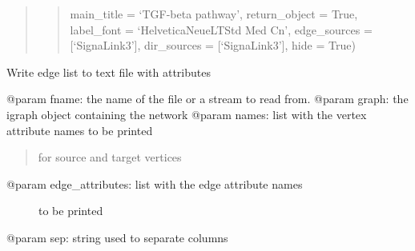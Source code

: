 \documentclass[letterpaper,10pt,english]{sphinxmanual}
\begin{document}
\begin{fulllineitems}
\begin{fulllineitems}
\begin{quote}
\begin{quote}
main\_title = ‘TGF-beta pathway’, return\_object = True,
label\_font = ‘HelveticaNeueLTStd Med Cn’,
edge\_sources = {[}‘SignaLink3’{]},
dir\_sources = {[}‘SignaLink3’{]}, hide = True)
\end{quote}
\end{quote}

\end{fulllineitems}


\begin{fulllineitems}
\label{\detokenize{main:pypath.main.PyPath.export_edgelist}}
Write edge list to text file with attributes

@param fname: the name of the file or a stream to read from.
@param graph: the igraph object containing the network
@param names: list with the vertex attribute names to be printed
\begin{quote}

for source and target vertices
\end{quote}
\begin{description}
\item[{@param edge\_attributes: list with the edge attribute names}] \leavevmode
to be printed

\end{description}

@param sep: string used to separate columns

\end{fulllineitems}


\begin{fulllineitems}
\label{\detokenize{main:pypath.main.PyPath.export_graphml}}
\end{fulllineitems}


\begin{fulllineitems}
\label{\detokenize{main:pypath.main.PyPath.export_ptms_tab}}
\end{fulllineitems}


\end{fulllineitems}
\end{document}
